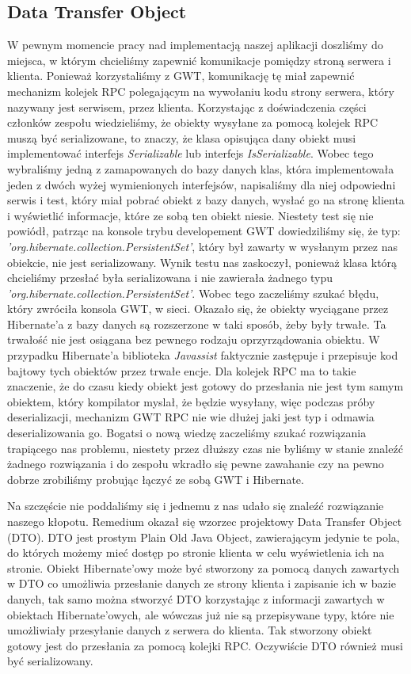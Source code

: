 \documentclass[licencjacka]{pracamgr}
\begin{document}
\subsection{Data Transfer Object}
W pewnym momencie pracy nad implementacją naszej aplikacji doszliśmy do miejsca, w którym chcieliśmy zapewnić komunikacje pomiędzy stroną
serwera i klienta. Ponieważ korzystaliśmy z GWT, komunikację tę miał zapewnić mechanizm kolejek RPC polegającym na wywołaniu kodu 
strony serwera, który nazywany jest serwisem, przez klienta. Korzystając z doświadczenia części członków zespołu wiedzieliśmy, że 
obiekty wysyłane za pomocą kolejek RPC muszą być serializowane, to znaczy, że klasa opisująca dany obiekt musi implementować interfejs 
\textit{Serializable} lub interfejs \textit{IsSerializable}. Wobec tego wybraliśmy jedną z zamapowanych do bazy danych klas, która implementowała jeden z 
dwóch wyżej wymienionych interfejsów, napisaliśmy dla niej odpowiedni serwis i test, który miał pobrać obiekt z bazy danych, wysłać go na stronę klienta
i wyświetlić informacje, które ze sobą ten obiekt niesie. Niestety test się nie powiódł, patrząc na konsole trybu developement GWT dowiedziliśmy 
się, że typ: \textit{'org.hibernate.collection.PersistentSet'}, który był zawarty w wysłanym przez nas obiekcie, nie jest serializowany. Wynik testu nas 
zaskoczył, ponieważ klasa którą chcieliśmy przesłać była serializowana i nie zawierała żadnego typu \textit{'org.hibernate.collection.PersistentSet'}.
Wobec tego zaczeliśmy szukać błędu, który zwróciła konsola GWT, w sieci. Okazało się, że obiekty wyciągane przez Hibernate'a z bazy danych są 
rozszerzone w taki sposób, żeby były trwałe. Ta trwałość nie jest osiągana bez pewnego rodzaju oprzyrządowania obiektu. W przypadku Hibernate'a 
biblioteka \textit{Javassist} faktycznie zastępuje i przepisuje kod bajtowy tych obiektów przez trwałe encje. Dla kolejek RPC ma to takie 
znaczenie, że do czasu kiedy obiekt jest gotowy do przesłania nie jest tym samym obiektem, który kompilator myslał, 
że będzie wysyłany, więc podczas próby deserializacji, mechanizm GWT RPC nie wie dłużej jaki jest typ i odmawia deserializowania go.
Bogatsi o nową wiedzę zaczeliśmy szukać rozwiązania trapiącego nas problemu, niestety przez dłuższy czas nie byliśmy w stanie znaleźć żadnego 
rozwiązania i do zespołu wkradło się pewne zawahanie czy na pewno dobrze zrobiliśmy probując łączyć ze sobą GWT i Hibernate. 

Na szczęście nie poddaliśmy się i jednemu z nas udało się znaleźć rozwiązanie naszego kłopotu. Remedium okazał się wzorzec projektowy Data Transfer Object (DTO).
DTO jest prostym Plain Old Java Object, zawierającym jedynie te pola, do których możemy mieć dostęp po stronie klienta w celu wyświetlenia ich 
na stronie. Obiekt Hibernate'owy może być stworzony za pomocą danych zawartych w DTO co umożliwia przesłanie danych ze strony klienta i zapisanie ich 
w bazie danych, tak samo można stworzyć DTO korzystając z informacji zawartych w obiektach Hibernate'owych, ale wówczas już nie są przepisywane typy, które 
nie umożliwiały przesyłanie danych z serwera do klienta. Tak stworzony obiekt gotowy jest do przesłania za pomocą kolejki RPC. Oczywiście DTO również musi być 
serializowany.
\end{document}
